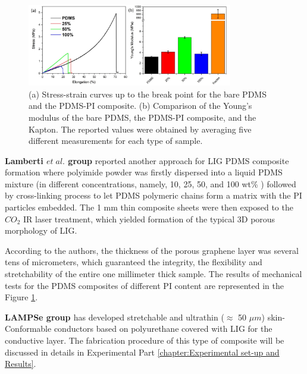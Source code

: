\begin{figure}[H]
\centering
\includegraphics[width=0.8\textwidth]{Figures/Theory/PI_PDMS_Lamberti.jpg}
\medskip
\captionsetup{width=0.95\linewidth}
\caption{(a) Stress-strain curves up to the break point for the bare PDMS and the PDMS-PI composite. (b) Comparison of the Young's modulus of the bare PDMS, the PDMS-PI composite, and the Kapton. The reported values were obtained by averaging five different measurements for each
type of sample. \cite{parmeggiani_pdmspolyimide_2019}}
\label{fig:PI_PDMS_Lamberti}
\end{figure}


\textbf{Lamberti $et \; al.$ \cite{parmeggiani_pdmspolyimide_2019} group} reported another approach for LIG PDMS composite formation where polyimide powder was firstly dispersed into a liquid PDMS mixture (in different concentrations, namely, 10, 25, 50, and 100 wt\% ) followed by cross-linking process to let PDMS polymeric chains form a matrix with the PI particles embedded. The 1 mm thin composite sheets were then exposed to the $CO_2$ IR laser treatment, which yielded formation of the typical 3D porous morphology of LIG. 

According to the authors, the thickness of the porous graphene layer was several tens of micrometers, which guaranteed the integrity, the flexibility and stretchability of the entire one millimeter thick sample. The results of mechanical tests for the PDMS composites of different PI content are represented in the Figure \ref{fig:PI_PDMS_Lamberti}.



\textbf{LAMPSe group \cite{dallinger_stretchable_2020}} has developed stretchable and ultrathin ($\approx$ 50 $\mu m$) skin-Conformable conductors based on polyurethane covered with LIG for the conductive layer. The fabrication procedure of this type of composite will be discussed in details in Experimental Part \ref{chapter:Experimental set-up and Results}. 


